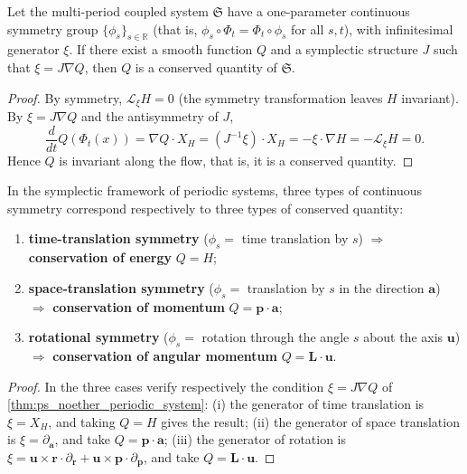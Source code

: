 \begin{theorem}\label{thm:ps_noether_periodic_system}
Let the multi-period coupled system $\mathfrak{S}$ have a one-parameter continuous symmetry group $\{\phi_s\}_{s\in\mathbb{R}}$ (that is, $\phi_s\circ\Phi_t=\Phi_t\circ\phi_s$ for all $s,t$), with infinitesimal generator $\xi$. If there exist a smooth function $Q$ and a symplectic structure $J$ such that $\xi = J\nabla Q$, then $Q$ is a conserved quantity of $\mathfrak{S}$.
\end{theorem}

\begin{proof}
By symmetry, $\mathcal{L}_\xi H = 0$ (the symmetry transformation leaves $H$ invariant). By $\xi = J\nabla Q$ and the antisymmetry of $J$,
\[
\frac{d}{dt}Q(\Phi_t(x)) = \nabla Q\cdot X_H = (J^{-1}\xi)\cdot X_H = -\xi\cdot\nabla H = -\mathcal{L}_\xi H = 0.
\]
Hence $Q$ is invariant along the flow, that is, it is a conserved quantity.
\end{proof}

\begin{corollary}\label{cor:ps_three_symmetries_conservation}
In the symplectic framework of periodic systems, three types of continuous symmetry correspond respectively to three types of conserved quantity:
\begin{enumerate}[label=(\roman*)]
    \item \textbf{time-translation symmetry} ($\phi_s = $ time translation by $s$) $\Rightarrow$ \textbf{conservation of energy} $Q = H$;
    \item \textbf{space-translation symmetry} ($\phi_s = $ translation by $s$ in the direction $\mathbf{a}$) $\Rightarrow$ \textbf{conservation of momentum} $Q = \mathbf{p}\cdot\mathbf{a}$;
    \item \textbf{rotational symmetry} ($\phi_s = $ rotation through the angle $s$ about the axis $\mathbf{u}$) $\Rightarrow$ \textbf{conservation of angular momentum} $Q = \mathbf{L}\cdot\mathbf{u}$.
\end{enumerate}
\end{corollary}

\begin{proof}
In the three cases verify respectively the condition $\xi = J\nabla Q$ of \cref{thm:ps_noether_periodic_system}: (i) the generator of time translation is $\xi = X_H$, and taking $Q = H$ gives the result; (ii) the generator of space translation is $\xi = \partial_{\mathbf{a}}$, and take $Q = \mathbf{p}\cdot\mathbf{a}$; (iii) the generator of rotation is $\xi = \mathbf{u}\times\mathbf{r}\cdot\partial_{\mathbf{r}} + \mathbf{u}\times\mathbf{p}\cdot\partial_{\mathbf{p}}$, and take $Q = \mathbf{L}\cdot\mathbf{u}$.
\end{proof}


